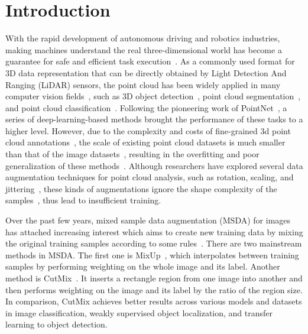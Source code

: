 \documentclass{article}
\begin{document}
\section{Introduction}
\label{submission}
With the rapid development of autonomous driving and robotics industries, making machines understand the real three-dimensional world has become a guarantee for safe and efficient task execution~\cite{deepplreview}. As a commonly used format for 3D data representation that can be directly obtained by Light Detection And Ranging (LiDAR) sensors, the point cloud has been widely applied in many computer vision fields~\cite{pointpillars,fastpointrcnn,pointGLR}, such as 3D object detection~\cite{pvrcnn,deformablepvrcnn}, point cloud segmentation~\cite{closer3d}, and point cloud classification~\cite{pointnet++, rscnn, dgcnn}. Following the pioneering work of PointNet~\cite{pointnet}, a series of deep-learning-based methods brought the performance of these tasks to a higher level. However, due to the complexity and costs of fine-grained 3d point cloud annotations~\cite{weaklypoints}, the scale of existing point cloud datasets is much smaller than that of the image datasets~\cite{pointmixup}, resulting in the overfitting and poor generalization of these methods~\cite{self_review}. Although researchers have explored several data augmentation techniques for point cloud analysis, such as rotation, scaling, and jittering~\cite{pointasnl,closer3d}, these kinds of augmentations ignore the shape complexity of the samples~\cite{pointaugment}, thus lead to insufficient training.

Over the past few years, mixed sample data augmentation (MSDA) for images has attached increasing interest which aims to create new training data by mixing the original training samples according to some rules~\cite{fmix,mixup_local}. There are two mainstream methods in MSDA. The first one is MixUp~\cite{mixup}, which interpolates between training samples by performing weighting on the whole image and its label. Another method is CutMix~\cite{cutmix}. It inserts a rectangle region from one image into another and then performs weighting on the image and its label by the ratio of the region size. In comparison, CutMix achieves better results across various models and datasets in image classification, weakly supervised object localization, and transfer learning to object detection.
\end{document}

